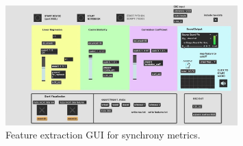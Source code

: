 \begin{figure}[htbp]
\centering
\includegraphics[width=0.8\textwidth]{Chapters/Figures/preliminary_actions/biosignals_actuation/Feature_Extraction_Sync_MAX.jpg}
\caption{Feature extraction GUI for synchrony metrics.}
\label{fig:feature_extraction_GUI}
\end{figure}

%

%

